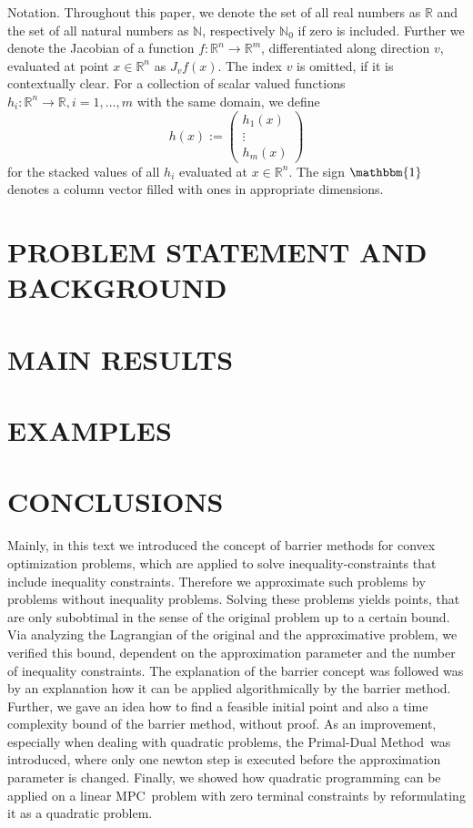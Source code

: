 \documentclass[a4paper, 10pt, conference]{ieeeconf}      %
\newcommand{\N}{\mathbb{N}}
\newcommand{\R}{\mathbb{R}}
\newcommand{\Rn}{\mathbb{R}^n}
\newcommand{\Rm}{\mathbb{R}^m}
\newcommand{\jac}{J}
\newcommand{\pdm}{Primal-Dual Method}
\newcommand{\ones}{\mathbbm{1}}
\newcommand{\mpc}{MPC}
\newcommand{\vectorthree}[3]{\begin{pmatrix}
		{#1} \\ {#2} \\ {#3}
\end{pmatrix}}
\begin{document}
Notation. Throughout this paper, we denote the set of all real numbers as $ \R $ and the set of all natural numbers as $ \N $, respectively $ \N_0  $ if zero is included. Further we denote the Jacobian of a function $ f: \Rn \longrightarrow \Rm $, differentiated along direction $ v $, evaluated at point $ x\in  \Rn $ as $ \jac_v f(x) $. The index $ v $ is omitted, if it is contextually clear. For a collection of scalar valued functions $ h_i: \Rn \longrightarrow \R, i = 1,\dots,m $ with the same domain, we define \[ h(x) := \vectorthree{h_1(x)}{\vdots}{h_m(x)} \] for the stacked values of all $ h_i $ evaluated at $ x \in \Rn $. The sign $ \ones $ denotes a column vector filled with ones in appropriate dimensions.

\section{PROBLEM STATEMENT AND BACKGROUND}


\section{MAIN RESULTS}


\section{EXAMPLES}


\section{CONCLUSIONS}
Mainly, in this text we introduced the concept of barrier methods for convex optimization problems, which are applied to solve inequality-constraints that include inequality constraints. Therefore we approximate such problems by problems without inequality problems. Solving these problems yields points, that are only subobtimal in the sense of the original problem up to a certain bound. Via analyzing the Lagrangian of the original and the approximative problem, we verified this bound, dependent on the approximation parameter and the number of inequality constraints. The explanation of the barrier concept was followed was by an explanation how it can be applied algorithmically by the barrier method. Further, we gave an idea how to find a feasible initial point and also a time complexity bound of the barrier method, without proof. As an improvement, especially when dealing with quadratic problems, the \pdm \ was introduced, where only one newton step is executed before the approximation parameter is changed. Finally, we showed how quadratic programming can be applied on a linear \mpc \ problem with zero terminal constraints by reformulating it as a quadratic problem.
\end{document}
